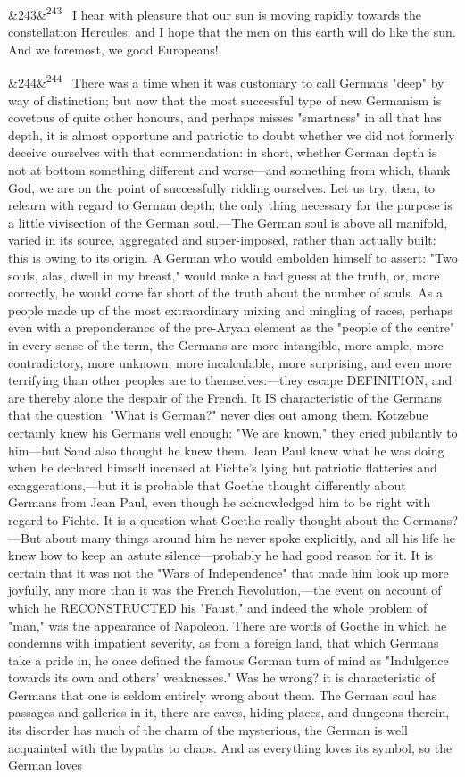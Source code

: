 \documentclass[12pt]{article}
\newcommand{\para}[1][]{\par\noindent\ifx&#1&\else\textsuperscript{\footnotesize #1}~\fi}
\begin{document}
\para[243] I hear with pleasure that our sun is moving rapidly towards the constellation Hercules: and I hope that the men on this earth will do like the sun. And we foremost, we good Europeans!

\para[244] There was a time when it was customary to call Germans "deep" by way of distinction; but now that the most successful type of new Germanism is covetous of quite other honours, and perhaps misses "smartness" in all that has depth, it is almost opportune and patriotic to doubt whether we did not formerly deceive ourselves with that commendation: in short, whether German depth is not at bottom something different and worse---and something from which, thank God, we are on the point of successfully ridding ourselves. Let us try, then, to relearn with regard to German depth; the only thing necessary for the purpose is a little vivisection of the German soul.---The German soul is above all manifold, varied in its source, aggregated and super-imposed, rather than actually built: this is owing to its origin. A German who would embolden himself to assert: "Two souls, alas, dwell in my breast," would make a bad guess at the truth, or, more correctly, he would come far short of the truth about the number of souls. As a people made up of the most extraordinary mixing and mingling of races, perhaps even with a preponderance of the pre-Aryan element as the "people of the centre" in every sense of the term, the Germans are more intangible, more ample, more contradictory, more unknown, more incalculable, more surprising, and even more terrifying than other peoples are to themselves:---they escape DEFINITION, and are thereby alone the despair of the French. It IS characteristic of the Germans that the question: "What is German?" never dies out among them. Kotzebue certainly knew his Germans well enough: "We are known," they cried jubilantly to him---but Sand also thought he knew them. Jean Paul knew what he was doing when he declared himself incensed at Fichte's lying but patriotic flatteries and exaggerations,---but it is probable that Goethe thought differently about Germans from Jean Paul, even though he acknowledged him to be right with regard to Fichte. It is a question what Goethe really thought about the Germans?---But about many things around him he never spoke explicitly, and all his life he knew how to keep an astute silence---probably he had good reason for it. It is certain that it was not the "Wars of Independence" that made him look up more joyfully, any more than it was the French Revolution,---the event on account of which he RECONSTRUCTED his "Faust," and indeed the whole problem of "man," was the appearance of Napoleon. There are words of Goethe in which he condemns with impatient severity, as from a foreign land, that which Germans take a pride in, he once defined the famous German turn of mind as "Indulgence towards its own and others' weaknesses." Was he wrong? it is characteristic of Germans that one is seldom entirely wrong about them. The German soul has passages and galleries in it, there are caves, hiding-places, and dungeons therein, its disorder has much of the charm of the mysterious, the German is well acquainted with the bypaths to chaos. And as everything loves its symbol, so the German loves 
\end{document}
